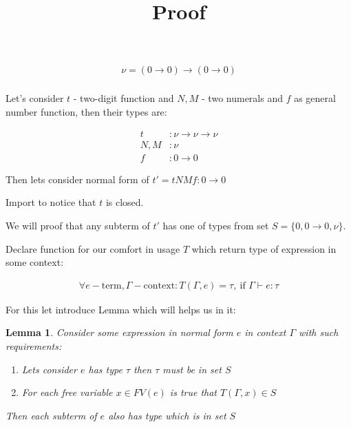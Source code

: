 \documentclass[11pt]{article}
\title{ Proof }
\newtheorem{lemma}[theorem]{Lemma}
\newcommand{\gt}{\tau}
\newcommand{\too}{\rightarrow}
\begin{document}
\maketitle	

\section*{}

\begin{align*}
    \nu = (0 \too 0) \too (0 \too 0) \\
\end{align*}

Let's consider \(t\) - two-digit function and \(N, M\) - two numerals and \(f\) as general number function, then their types are:

\begin{align*}
    t &: \nu \too \nu \too \nu \\
    N, M &: \nu \\
    f &: 0 \too 0
\end{align*}

Then lets consider normal form of \(t' = t N M f : 0 \too 0\)

Import to notice that \(t\) is closed.

We will proof that any subterm of \(t'\) has one of types from set \(S = \{0, 0 \too 0, \nu\}\).

Declare function for our comfort in usage \(T\) which return type of expression in some context: 

\begin{align*}
    \forall e - \text{term}, \Gamma - \text{context} : T(\Gamma, e) = \gt,\ \text{if \(\Gamma \vdash e:\gt\)}
\end{align*}

For this let introduce Lemma which will helps us in it:

\begin{lemma}
    Consider some expression in normal form \(e\) in context \(\Gamma\) with such requirements:
    \begin{enumerate}
        \item Lets consider \(e\) has type \(\tau\) then \(\tau\) must be in set \(S\)
        \item For each free variable \(x \in FV(e)\) is true that \(T(\Gamma, x) \in S\)
    \end{enumerate}
    Then each subterm of \(e\) also has type which is in set \(S\)
\end{lemma}
\end{document}
